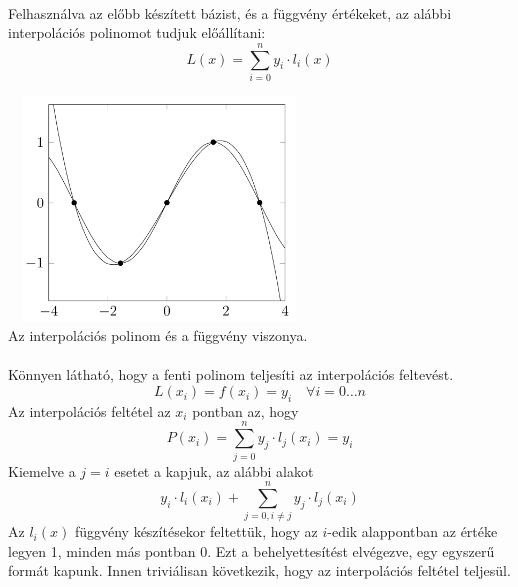 \documentclass{elteikthesis}
\begin{document}
\paragraph{}
Felhasználva az előbb készített bázist, és a függvény értékeket, az alábbi interpolációs polinomot tudjuk előállítani:$$L(x) = \sum_{i=0}^{n} y_i \cdot l_i(x)$$
\begin{center}
\includegraphics[width=8cm,height=6cm]{pics/polynomial_interpolation}\\
{\footnotesize Az interpolációs polinom és a függvény viszonya.}
\end{center}
\paragraph{}
Könnyen látható, hogy a fenti polinom teljesíti az interpolációs feltevést.
$$L
(x_i) = f(x_i) = y_i \quad \forall i = 0\dots{n}
$$
Az interpolációs feltétel az $x_i$ pontban az, hogy
$$
P(x_i)=\sum_{j=0}^{n} y_j\cdot l_j(x_i) = y_i
$$
Kiemelve a $j = i$ esetet a kapjuk, az alábbi alakot
$$
y_i \cdot l_i(x_i) + \sum_{j=0, i \neq j}^{n} y_j \cdot l_j(x_i)
$$
Az $l_i(x)$ függvény készítésekor feltettük, hogy az $i$-edik alappontban az értéke legyen 1, minden más pontban 0. Ezt a behelyettesítést elvégezve, egy egyszerű formát kapunk. Innen triviálisan következik, hogy az interpolációs feltétel teljesül.
\end{document}
